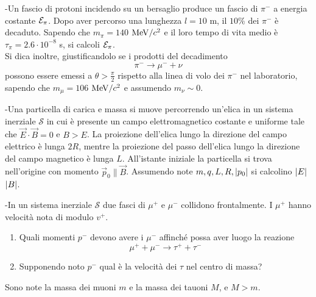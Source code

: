 \documentclass[12pt,twoside,a4]{article}
\begin{document}
\bigskip

\begin{esercizio}[Esame 18-06-2006] 
-Un fascio di protoni incidendo su un bersaglio produce un fascio di  $\pi^-$ a energia costante $\mathcal{E}_\pi$. Dopo aver percorso una lunghezza $l = 10$ m, il $10 \%$ dei $\pi^-$ è decaduto.  Sapendo che $m_\pi = 140$ $\mathrm{MeV}/c^2$ e il loro tempo di vita medio è $\tau_\pi = 2.6 \cdot 10^{-8}$ s, si calcoli $\mathcal{E}_\pi$.
\\
Si dica inoltre, giustificandolo se i prodotti del decadimento
$$ \pi^- \longrightarrow \mu^- + \nu $$
possono essere emessi a $\theta > \frac{\pi}{2}$ rispetto alla linea di volo dei $\pi^-$
nel laboratorio, sapendo che $m_\mu = 106$ $\mathrm{MeV}/c^2$ e assumendo $m_\nu \sim 0$.
\end{esercizio}


\begin{esercizio}[Esame 14-07-2006]
	-Una particella di carica  e  massa  si muove percorrendo un'elica in un sistema inerziale $\mathcal{S}$ in cui è presente un campo elettromagnetico costante e uniforme tale che $\vec{E} \cdot \vec{B} = 0$ e $B > E$. La proiezione dell'elica lungo la direzione del campo elettrico è lunga $2R$, mentre la proiezione del passo dell'elica lungo la direzione del campo magnetico è lunga $L$. All'istante iniziale la particella si trova nell'origine con momento $\vec{p}_0 \parallel \vec{B}$. Assumendo note $m,q,L,R, \left| {p_0} \right|$ si calcolino $\left| {E} \right|$ $\left| {B} \right|$.
\end{esercizio}



\begin{esercizio}[Esame 07-09-2006]
	-In un sistema inerziale $\mathcal{S}$ due fasci di $\mu^+$ e $\mu^-$ collidono frontalmente. I $\mu^+$ hanno velocità  nota di modulo $v^+.$
\begin{enumerate}[label=(\textit{\roman*})]
\item Quali momenti $p^-$ devono avere i $\mu^-$ affinché possa aver luogo la reazione
$$ \mu^+ + \mu^- \longrightarrow \tau^+ + \tau^-$$
\item Supponendo noto $p^-$ qual è la velocità  dei $\tau$ nel centro di massa?
\end{enumerate}
Sono note la massa dei muoni $m$ e la massa dei tauoni $M$, e $M > m$.
\end{esercizio}

\newpage
\end{document}
